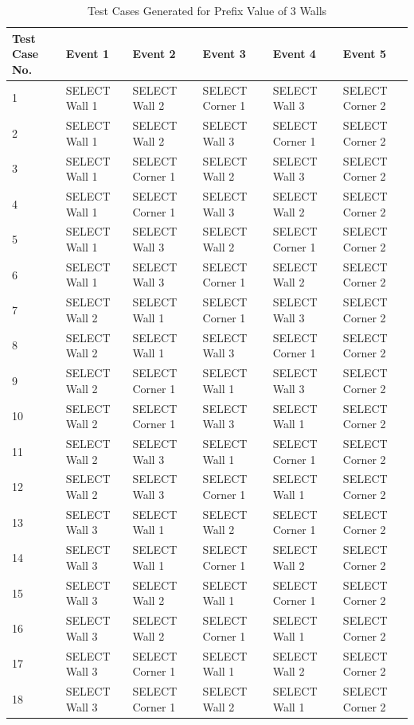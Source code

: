 \documentclass[final,3p]{CSP}
\begin{document}
\begin{table}[]
    \centering
    \begin{tabular}{|p{2cm}|p{2cm}|p{2cm}|p{2cm}|p{2cm}|p{2cm}|}
    \hline
     Test Case No. & Event 1 & Event 2 & Event 3 & Event 4 & Event 5  \\
     \hline
    1 & SELECT Wall 1 & SELECT Wall 2 & SELECT Corner 1 & SELECT Wall 3 & SELECT Corner 2 \\
    \hline
    2 & SELECT Wall 1 & SELECT Wall 2 & SELECT Wall 3 & SELECT Corner 1 & SELECT Corner 2 \\
    \hline
    3 & SELECT Wall 1 & SELECT Corner 1 & SELECT Wall 2 & SELECT Wall 3 & SELECT Corner 2 \\
    \hline
    4 & SELECT Wall 1 & SELECT Corner 1 & SELECT Wall 3 & SELECT Wall 2 & SELECT Corner 2 \\
    \hline
    5 & SELECT Wall 1 & SELECT Wall 3 & SELECT Wall 2 & SELECT Corner 1 & SELECT Corner 2 \\
    \hline
    6 & SELECT Wall 1 & SELECT Wall 3 & SELECT Corner 1 & SELECT Wall 2 & SELECT Corner 2 \\
    \hline
    7 & SELECT Wall 2 & SELECT Wall 1 & SELECT Corner 1 & SELECT Wall 3 & SELECT Corner 2 \\
    \hline
    8 & SELECT Wall 2 & SELECT Wall 1 & SELECT Wall 3 & SELECT Corner 1 & SELECT Corner 2 \\
    \hline
    9 & SELECT Wall 2 & SELECT Corner 1 & SELECT Wall 1 & SELECT Wall 3& SELECT Corner 2 \\
    \hline
    10 & SELECT Wall 2 & SELECT Corner 1 & SELECT Wall 3 & SELECT Wall 1 & SELECT Corner 2 \\
    \hline
    11 & SELECT Wall 2 & SELECT Wall 3 & SELECT Wall 1 & SELECT Corner 1 & SELECT Corner 2 \\
    \hline
    12 & SELECT Wall 2 & SELECT Wall 3 & SELECT Corner 1 & SELECT Wall 1 & SELECT Corner 2 \\
    \hline
    13 & SELECT Wall 3 & SELECT Wall 1 & SELECT Wall 2 & SELECT Corner 1 & SELECT Corner 2 \\
    \hline
    14 & SELECT Wall 3 & SELECT Wall 1 & SELECT Corner 1 & SELECT Wall 2 & SELECT Corner 2 \\
    \hline
    15 & SELECT Wall 3 & SELECT Wall 2 & SELECT Wall 1 & SELECT Corner 1 & SELECT Corner 2 \\
    \hline
    16 & SELECT Wall 3 & SELECT Wall 2 & SELECT Corner 1 & SELECT Wall 1 & SELECT Corner 2 \\
    \hline
    17 & SELECT Wall 3 & SELECT Corner 1 & SELECT Wall 1 & SELECT Wall 2	& SELECT Corner 2 \\
    \hline
    18 & SELECT Wall 3 & SELECT Corner 1 & SELECT Wall 2 & SELECT Wall 1 & SELECT Corner 2 \\
    \hline
    \end{tabular}
    \caption{Test Cases Generated for Prefix Value of 3 Walls}
    \label{tab:3walls}
\end{table}
\end{document}
